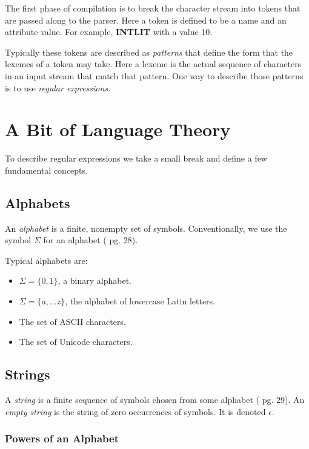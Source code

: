 \documentclass[a4paper,oneside,11pt]{book}
\theoremstyle{definition}
\begin{document}
The first phase of compilation is to break the character stream into tokens that are passed along to the parser.
Here a token is defined to be a name and an attribute value.
For example, \textbf{INTLIT} with a value 10.

Typically these tokens are described as \emph{patterns} that define the form
that the lexemes of a token may take. Here a lexeme is the actual sequence of
characters in an input stream that match that pattern.
One way to describe those patterns is to use \emph{regular expressions}.

\section{A Bit of Language Theory}

To describe regular expressions we take a small break and define a few fundamental concepts.

\subsection{Alphabets}

An \emph{alphabet} is a finite, nonempty set of symbols.
Conventionally, we use the symbol $\Sigma$ for an alphabet (\cite{AUTOMATA} pg. 28).

Typical alphabets are:
\begin{itemize}
\item
$\Sigma = \{0, 1\}$, a binary alphabet.

\item
$\Sigma = \{a, \ldots z\}$, the alphabet of lowercase Latin letters.

\item
The set of ASCII characters.

\item
The set of Unicode characters.
\end{itemize}

\subsection{Strings}

A \emph{string} is a finite sequence of symbols chosen from some alphabet (\cite{AUTOMATA} pg. 29).
An \emph{empty string} is the string of zero occurrences of symbols. It is denoted $\epsilon$.

\subsubsection{Powers of an Alphabet}
\end{document}
